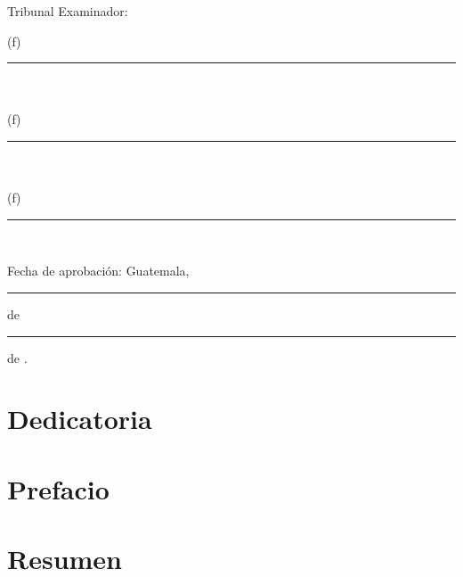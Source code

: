 \documentclass[11pt, letterpaper, twoside, openright]{report}
\newcommand{\defaultparformat}[1]{
	{\setlength{\parskip}{2ex}
     }
}
\begin{document}
	Tribunal Examinador:\\[1cm]
	\begin{center}
		(f) \rule[1pt]{4 in}{1pt}\\
		\nombreasesor \\[1in]
		(f) \rule[1pt]{4 in}{1pt}\\
		\nombreprimerex \\[1in]
		(f) \rule[1pt]{4 in}{1pt}\\
		\nombresegundoex
	\end{center}
	\vspace{1in}

	Fecha de aprobación: Guatemala, \rule[1pt]{0.5 in}{1pt} de \rule[1pt]{1
		in}{1pt} de \anoaprobacion. \normalsize \fi

\pagestyle{plain}
\ifdefined\CAPdedicatoria
	\newpage
	\cleardoublepage{}
	\chapter*{Dedicatoria}
	\ifdefined\parpordefecto
		\defaultparformat{a-dedicatoria}
	\else
		
	\fi
\fi
\ifdefined\CAPprefacio
	\newpage
	\cleardoublepage{}
	\chapter*{Prefacio}
	\ifdefined\parpordefecto
		\defaultparformat{b-prefacio}
	\else
		
	\fi
\fi

\ifdefined\CAPresumen
	\newpage
	\cleardoublepage{}
	\chapter*{Resumen}
	\ifdefined\parpordefecto
		\defaultparformat{c-resumen}
	\else
		
	\fi
\fi
\end{document}
